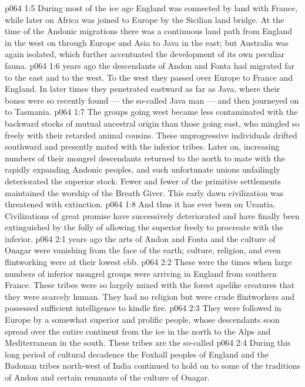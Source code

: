 \vs p064 1:5 During most of the ice age England was connected by land with France, while later on Africa was joined to Europe by the Sicilian land bridge. At the time of the Andonic migrations there was a continuous land path from England in the west on through Europe and Asia to Java in the east; but Australia was again isolated, which further accentuated the development of its own peculiar fauna.
\vs p064 1:6 \pc {} years ago the descendants of Andon and Fonta had migrated far to the east and to the west. To the west they passed over Europe to France and England. In later times they penetrated eastward as far as Java, where their bones were so recently found --- the so\hyp{}called Java man --- and then journeyed on to Tasmania.
\vs p064 1:7 The groups going west became less contaminated with the backward stocks of mutual ancestral origin than those going east, who mingled so freely with their retarded animal cousins. These unprogressive individuals drifted southward and presently mated with the inferior tribes. Later on, increasing numbers of their mongrel descendants returned to the north to mate with the rapidly expanding Andonic peoples, and such unfortunate unions unfailingly deteriorated the superior stock. Fewer and fewer of the primitive settlements maintained the worship of the Breath Giver. This early dawn civilization was threatened with extinction.
\vs p064 1:8 And thus it has ever been on Urantia. Civilizations of great promise have successively deteriorated and have finally been extinguished by the folly of allowing the superior freely to procreate with the inferior.
\vs p064 2:1  years ago the arts of Andon and Fonta and the culture of Onagar were vanishing from the face of the earth; culture, religion, and even flintworking were at their lowest ebb.
\vs p064 2:2 These were the times when large numbers of inferior mongrel groups were arriving in England from southern France. These tribes were so largely mixed with the forest apelike creatures that they were scarcely human. They had no religion but were crude flintworkers and possessed sufficient intelligence to kindle fire.
\vs p064 2:3 They were followed in Europe by a somewhat superior and prolific people, whose descendants soon spread over the entire continent from the ice in the north to the Alps and Mediterranean in the south. These tribes are the so\hyp{}called 
\vs p064 2:4 During this long period of cultural decadence the Foxhall peoples of England and the Badonan tribes north\hyp{}west of India continued to hold on to some of the traditions of Andon and certain remnants of the culture of Onagar.
